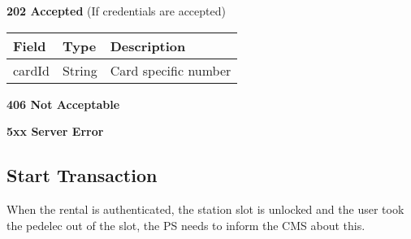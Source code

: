 \textbf{202 Accepted} (If credentials are accepted)

\begin{table}[!h]
\begin{tabularx}{\linewidth}{ | l | l | X | }
  \hline
  \rowcolor{table-head}
  Field & Type & Description \\
  \hline
  	cardId 		& String & Card specific number\\
    \hline
\end{tabularx}
\end{table}

 \textbf{406 Not Acceptable}

\textbf{5xx Server Error}

%
%
%
%
%
%
%
%
%


\subsection{Start Transaction}

When the rental is authenticated, the station slot is unlocked and the user took the pedelec out of the slot, the \acs{PS} needs to inform the \acs{CMS} about this.

